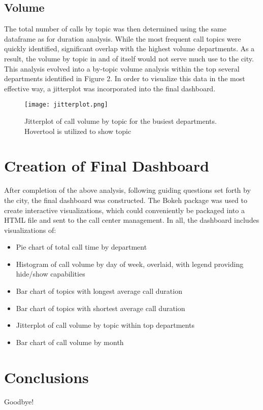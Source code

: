 \documentclass[11pt,twocolumn]{article}
\begin{document}
\subsection{Volume}
The total number of calls by topic was then determined using the same dataframe as for duration analysis.  While the most frequent call topics were quickly identified, significant overlap with the highest volume departments.  As a result, the volume by topic in and of itself would not serve much use to the city.  This analysis evolved into a by-topic volume analysis within the top several departments identified in Figure 2.  In order to visualize this data in the most effective way, a jitterplot was incorporated into the final dashboard.
\begin{figure}[h]
  \texttt{[image: jitterplot.png]}
  \caption{Jitterplot of call volume by topic for the busiest departments.  Hovertool is utilized to show topic}
\end{figure}

\section{Creation of Final Dashboard}
After completion of the above analysis, following guiding questions set forth by the city, the final dashboard was constructed.  The Bokeh package was used to create interactive visualizations, which could conveniently be packaged into a HTML file and sent to the call center management.  In all, the dashboard includes visualizations of:
\begin{itemize}
  \item{Pie chart of total call time by department}
  \item{Histogram of call volume by day of week, overlaid, with legend providing hide/show capabilities}
  \item{Bar chart of topics with longest average call duration}
  \item{Bar chart of topics with shortest average call duration}
  \item{Jitterplot of call volume by topic within top departments}
  \item{Bar chart of call volume by month}
\end{itemize}

\section{Conclusions}

Goodbye!
\end{document}

